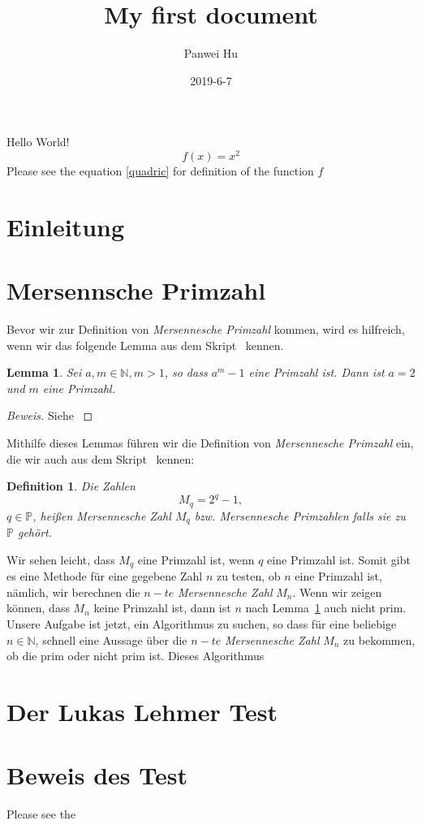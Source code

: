 \documentclass{article}
\title{My first document}
\date{2019-6-7}
\author{Panwei Hu}
\newtheorem{lemma}{Lemma}
\newtheorem{definition}{Definition}
\newcommand{\myparaDent}{12pt}
\newcommand{\Nature}{\ensuremath{\mathbb{N}}}
\begin{document}
  \maketitle
  \newpage
 \tableofcontents
	\newpage
  \newpage

  Hello World!
  \begin{equation}
  \label{quadric}
  	f(x) = x^2
  \end{equation}
Please see the equation \ref{quadric} for
definition of the function $f$
\newpage
\section{Einleitung}

\section{Mersennsche Primzahl}
Bevor wir zur Definition von \emph{Mersennesche Primzahl} kommen, wird es
hilfreich, wenn wir das folgende Lemma aus dem Skript~\cite{script} kennen.
\begin{lemma}\label{lem1}
	Sei $a,m \in \mathbb{N},m > 1$, so dass $a^m - 1$ eine Primzahl ist. Dann ist
	$a = 2$ und $m$ eine Primzahl.
\end{lemma}
\begin{proof}[Beweis]
Siehe \cite{script}
\end{proof}
Mithilfe dieses Lemmas f\"{u}hren wir die Definition von \emph{Mersennesche Primzahl} ein, die wir auch aus dem Skript~\cite{script} kennen:
\begin{definition}
Die Zahlen
\[
	M_{q} = 2^{q} - 1,
\]
$q \in \mathbb{P}$, hei{\ss}en \emph{Mersennesche Zahl} $M_{q}$ bzw. \emph{Mersennesche Primzahlen} falls sie zu $\mathbb{P}$ geh\"{o}rt.
\end{definition}
Wir sehen leicht, dass $M_{q}$ eine Primzahl ist, wenn $q$ eine Primzahl ist.
Somit gibt es eine Methode f\"{u}r eine gegebene Zahl $n$ zu testen, ob $n$ eine Primzahl ist, n\"{a}mlich, wir berechnen die $n-te$ \emph{Mersennesche Zahl} $M_{n}$. Wenn wir zeigen k\"{o}nnen, dass $M_{n}$ keine Primzahl ist, dann ist $n$ nach Lemma~\ref{lem1} auch nicht prim.\\[\myparaDent]
Unsere Aufgabe ist jetzt, ein Algorithmus zu suchen, so dass f\"{u}r eine beliebige $n \in \Nature$, schnell eine Aussage \"{u}ber die $n-te$ \emph{Mersennesche Zahl} $M_{n}$ zu bekommen, ob die prim oder nicht prim ist. Dieses Algorithmus

\section{Der Lukas Lehmer Test}

\section{Beweis des Test}

\newpage
\begin{appendix}

\end{appendix}

Please see the \cite{zahlentheorie}
\newpage


\end{document}

